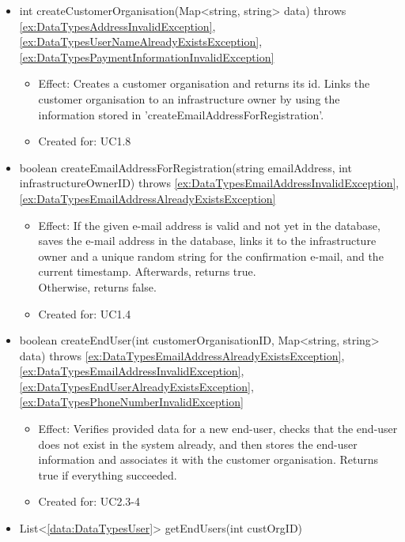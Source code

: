 \begin{description}
\begin{itemize}[noitemsep,nolistsep,leftmargin=-.25cm]
      \item \textsf{int createCustomerOrganisation(Map\textless{}string, string\textgreater{} data) throws \ref{ex:DataTypesAddressInvalidException}, \ref{ex:DataTypesUserNameAlreadyExistsException}, \ref{ex:DataTypesPaymentInformationInvalidException}}
        \begin{itemize}[noitemsep,nolistsep]
           \item Effect: Creates a customer organisation and returns its id. Links the customer organisation to an infrastructure owner by using the information stored in 'createEmailAddressForRegistration'.
\item Created for: UC1.8
        \end{itemize}
      \item \textsf{boolean createEmailAddressForRegistration(string emailAddress, int infrastructureOwnerID) throws \ref{ex:DataTypesEmailAddressInvalidException}, \ref{ex:DataTypesEmailAddressAlreadyExistsException}}
        \begin{itemize}[noitemsep,nolistsep]
           \item Effect: If the given e-mail address is valid and not yet in the database, saves the e-mail address
in the database, links it to the infrastructure owner and a unique random string for the confirmation e-mail,
and the current timestamp. Afterwards, returns true. \\
Otherwise, returns false.
\item Created for: UC1.4
        \end{itemize}
      \item \textsf{boolean createEndUser(int customerOrganisationID, Map\textless{}string, string\textgreater{} data) throws \ref{ex:DataTypesEmailAddressAlreadyExistsException}, \ref{ex:DataTypesEmailAddressInvalidException}, \ref{ex:DataTypesEndUserAlreadyExistsException}, \ref{ex:DataTypesPhoneNumberInvalidException}}
        \begin{itemize}[noitemsep,nolistsep]
           \item Effect: Verifies provided data for a new end-user, checks that the end-user does not exist in the system already, and then stores the end-user information and associates it with the customer organisation. Returns true if everything succeeded.
\item Created for: UC2.3-4
        \end{itemize}
      \item \textsf{List\textless{}\ref{data:DataTypesUser}\textgreater{} getEndUsers(int custOrgID)}

\end{itemize}
\end{description}
